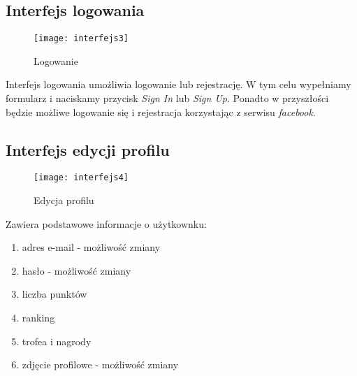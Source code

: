 \documentclass[12pt]{article}
\begin{document}
\subsection{Interfejs logowania}

\begin{figure}[!ht]
  \centering
	\texttt{[image: interfejs3]}
  \caption{Logowanie}
\end{figure}

Interfejs logowania umożliwia logowanie lub rejestrację. W tym celu wypełniamy formularz i naciskamy przycisk \textit{Sign In} lub \textit{Sign Up}.
Ponadto w przyszłości będzie możliwe logowanie się i rejestracja korzystając z serwisu \textit{facebook}.

\subsection{Interfejs edycji profilu}

\begin{figure}[!ht]
  \centering
	\texttt{[image: interfejs4]}
  \caption{Edycja profilu}
\end{figure}

Zawiera podstawowe informacje o użytkownku:
\begin{enumerate}
\item adres e-mail - możliwość zmiany
\item hasło - możliwość zmiany
\item liczba punktów
\item ranking
\item trofea i nagrody
\item zdjęcie profilowe - możliwość zmiany
\end{enumerate}
\end{document}
